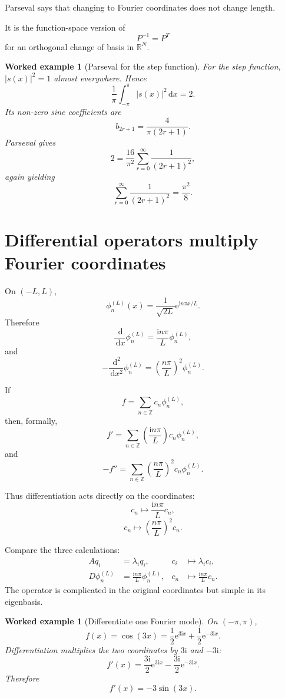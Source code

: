 \documentclass[11pt,a5paper,oneside,openany]{scrreprt}
\theoremstyle{notes}
\theoremstyle{definitions}
\newtheorem{example}[theorem]{Worked example}
\newcommand{\R}{\mathbb{R}}
\newcommand{\Z}{\mathbb{Z}}
\newcommand{\dd}{\,\mathrm{d}}
\newcommand{\e}{\mathrm{e}}
\begin{document}
\begin{bridge}
Parseval says that changing to Fourier coordinates does not change length.

It is the function-space version of
\[
 P^{-1}=P^T
\]
for an orthogonal change of basis in $\R^N$.
\end{bridge}

\begin{example}[Parseval for the step function]
For the step function, $|s(x)|^2=1$ almost everywhere.  Hence
\[
 \frac1\pi\int_{-\pi}^{\pi}|s(x)|^2\dd x=2.
\]
Its non-zero sine coefficients are
\[
 b_{2r+1}=\frac4{\pi(2r+1)}.
\]
Parseval gives
\[
 2=\frac{16}{\pi^2}
 \sum_{r=0}^{\infty}\frac1{(2r+1)^2},
\]
again yielding
\[
 \sum_{r=0}^{\infty}\frac1{(2r+1)^2}
 =\frac{\pi^2}{8}.
\]
\end{example}

\section{Differential operators multiply Fourier coordinates}

On $(-L,L)$,
\[
 \phi_n^{(L)}(x)
 =\frac1{\sqrt{2L}}\e^{\mathrm i n\pi x/L}.
\]
Therefore
\[
 \frac{\dd}{\dd x}\phi_n^{(L)}
 =\frac{\mathrm i n\pi}{L}\phi_n^{(L)},
\]
and
\[
 -\frac{\dd^2}{\dd x^2}\phi_n^{(L)}
 =\left(\frac{n\pi}{L}\right)^2\phi_n^{(L)}.
\]

If
\[
 f=\sum_{n\in\Z}c_n\phi_n^{(L)},
\]
then, formally,
\[
 \boxed{
 f'
 =\sum_{n\in\Z}
 \left(\frac{\mathrm i n\pi}{L}\right)
 c_n\phi_n^{(L)},}
\]
and
\[
 \boxed{
 -f''
 =\sum_{n\in\Z}
 \left(\frac{n\pi}{L}\right)^2
 c_n\phi_n^{(L)}.}
\]

Thus differentiation acts directly on the coordinates:
\[
 c_n\longmapsto
 \frac{\mathrm i n\pi}{L}c_n,
\]
\[
 c_n\longmapsto
 \left(\frac{n\pi}{L}\right)^2c_n.
\]

\begin{bridge}
Compare the three calculations:
\[
 \begin{aligned}
 A q_i&=\lambda_iq_i,
 &c_i&\longmapsto\lambda_i c_i,\\
 D\phi_n^{(L)}
 &=\frac{\mathrm i n\pi}{L}\phi_n^{(L)},
 &c_n&\longmapsto\frac{\mathrm i n\pi}{L}c_n.
 \end{aligned}
\]
The operator is complicated in the original coordinates but simple in its
eigenbasis.
\end{bridge}

\begin{example}[Differentiate one Fourier mode]
On $(-\pi,\pi)$,
\[
 f(x)=\cos(3x)
 =\frac12\e^{3\mathrm i x}
 +\frac12\e^{-3\mathrm i x}.
\]
Differentiation multiplies the two coordinates by $3\mathrm i$ and
$-3\mathrm i$:
\[
 f'(x)
 =\frac{3\mathrm i}{2}\e^{3\mathrm i x}
 -\frac{3\mathrm i}{2}\e^{-3\mathrm i x}.
\]
Therefore
\[
 f'(x)=-3\sin(3x).
\]
\end{example}
\end{document}
